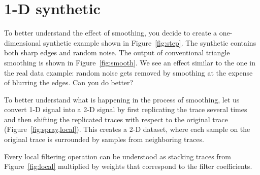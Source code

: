 \lstset{basicstyle=\small\ttfamily,breaklines=true}
\lstset{language=python,numbers=left,numberstyle=\tiny,showstringspaces=false}


\section{1-D synthetic}


To better understand the effect of smoothing, you decide to create a
one-dimensional synthetic example shown in Figure~\ref{fig:step}. The
synthetic contains both sharp edges and random noise.  The output of
conventional triangle smoothing is shown in
Figure~\ref{fig:smooth}. We see an effect similar to the one in the
real data example: random noise gets removed by smoothing at the
expense of blurring the edges. Can you do better?


To better understand what is happening in the process of smoothing,
let us convert 1-D signal into a 2-D signal by first replicating the
trace several times and then shifting the replicated traces with
respect to the original trace (Figure~\ref{fig:spray,local}). This
creates a 2-D dataset, where each sample on the original trace is
surrounded by samples from neighboring traces.

Every local filtering operation can be understood as stacking traces
from Figure~\ref{fig:local} multiplied by weights that correspond to
the filter coefficients.

